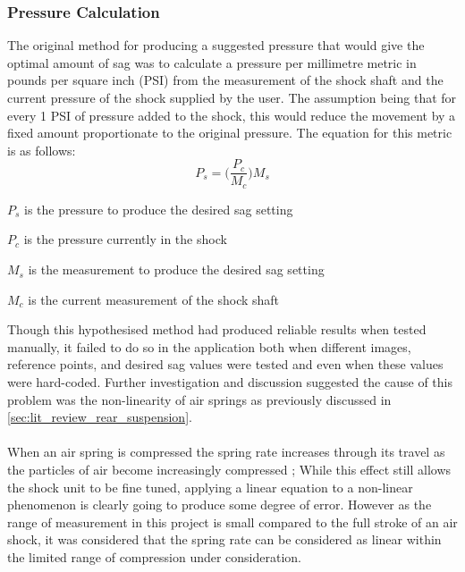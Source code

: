 		\subsubsection{Pressure Calculation}\label{sec:results_pressure_calculation}
			The original method for producing a suggested pressure that would give the optimal amount of sag was to calculate a pressure per millimetre metric in pounds per square inch (PSI) from the measurement of the shock shaft and the current pressure of the shock supplied by the user. The assumption being that for every 1 PSI of pressure added to the shock, this would reduce the movement by a fixed amount proportionate to the original pressure. The equation for this metric is as follows:
			\begin{equation}
				\label{equ:pxpermm}
				P_s = \Bigg(\frac{P_c}{M_c}\Bigg)M_s
			\end{equation}
			\begin{where}
				\item $P_s$ is the pressure to produce the desired sag setting
				\item $P_c$ is the pressure currently in the shock
				\item $M_s$ is the measurement to produce the desired sag setting
				\item $M_c$ is the current measurement of the shock shaft
			\end{where}
			\vspace{5mm}
			Though this hypothesised method had produced reliable results when tested manually, it failed to do so in the application both when different images, reference points, and desired sag values were tested and even when these values were hard-coded. Further investigation and discussion suggested the cause of this problem was the non-linearity of air springs as previously discussed in \ref{sec:lit_review_rear_suspension}.
			\\\\
			When an air spring is compressed the spring rate increases through its travel as the particles of air become increasingly compressed \citep{goodyear2014air}; While this effect still allows the shock unit to be fine tuned, applying a linear equation to a non-linear phenomenon is clearly going to produce some degree of error. However as the range of measurement in this project is small compared to the full stroke of an air shock, it was considered that the spring rate can be considered as linear within the limited range of compression under consideration.
			\\\\
